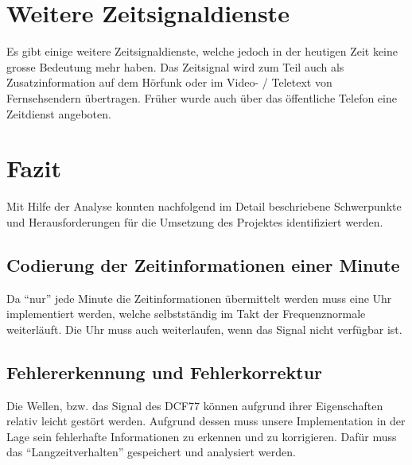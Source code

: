 
\section{Weitere Zeitsignaldienste}
Es gibt einige weitere Zeitsignaldienste, welche jedoch in der heutigen Zeit keine grosse Bedeutung mehr haben. Das Zeitsignal wird zum Teil auch als Zusatzinformation auf dem Hörfunk oder im Video- / Teletext von Fernsehsendern übertragen. Früher wurde auch über das öffentliche Telefon eine Zeitdienst angeboten.

\section{Fazit}
Mit Hilfe der Analyse konnten nachfolgend im Detail beschriebene Schwerpunkte und Herausforderungen für die Umsetzung des Projektes identifiziert werden.

\subsection{Codierung der Zeitinformationen einer Minute}
Da "`nur"' jede Minute die Zeitinformationen übermittelt werden muss eine Uhr implementiert werden, welche selbstständig im Takt der Frequenznormale weiterläuft. Die Uhr muss auch weiterlaufen, wenn das Signal nicht verfügbar ist.

\subsection{Fehlererkennung und Fehlerkorrektur}
Die Wellen, bzw. das Signal des DCF77 können aufgrund ihrer Eigenschaften relativ leicht gestört werden. Aufgrund dessen muss unsere Implementation in der Lage sein fehlerhafte Informationen zu erkennen und zu korrigieren. Dafür muss das "`Langzeitverhalten"' gespeichert und analysiert werden.

